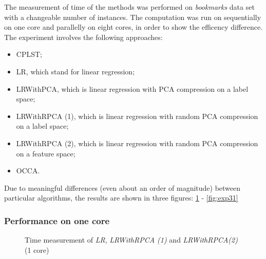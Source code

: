 The measurement of time of the methods was performed on \textit{bookmarks} data set with a changeable number of instances. The computation was run on sequentially on one core and parallelly on eight cores, in order to show the efficency difference. The experiment involves the following approaches:
\begin{itemize}
    \item CPLST;
    \item LR, which stand for linear regression;
    \item LRWithPCA, which is linear regression with PCA compression on a label space;
    \item LRWithRPCA (1), which is linear regression with random PCA compression on a label space;
    \item LRWithRPCA (2), which is linear regression with random PCA compression on a feature space;
    \item OCCA.
\end{itemize}
Due to meaningful differences (even about an order of magnitude) between particular algorithms, the results are shown in three figures: \ref{fig:exp29} - \ref{fig:exp31}

\newpage
\subsubsection{Performance on one core}

\begin{figure}[H]
\centering
\caption{Time measurement of \textit{LR}, \textit{LRWithRPCA (1)} and \textit{LRWithRPCA(2)} (1 core)}
\label{fig:exp29}
\end{figure}

